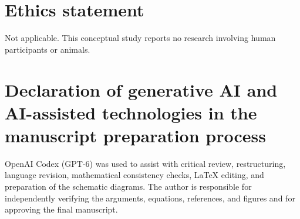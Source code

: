 \documentclass[review,12pt]{elsarticle}
\begin{document}
\section*{Ethics statement}
Not applicable. This conceptual study reports no research involving human participants or animals.
\section*{Declaration of generative AI and AI-assisted technologies in the manuscript preparation process}
OpenAI Codex (GPT-6) was used to assist with critical review, restructuring, language revision, mathematical consistency checks, LaTeX editing, and preparation of the schematic diagrams. The author is responsible for independently verifying the arguments, equations, references, and figures and for approving the final manuscript.


\end{document}

